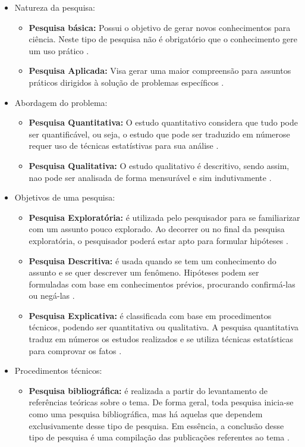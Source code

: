 \begin{itemize}
\item Natureza da pesquisa:
	\begin{itemize}
	\item \textbf{Pesquisa básica:} Possui o objetivo de gerar novos conhecimentos para ciência. Neste tipo de pesquisa não é obrigatório que o conhecimento gere um uso prático \cite{Tafner:2007}.
	\item \textbf{Pesquisa Aplicada:} Visa gerar uma maior compreensão para assuntos práticos dirigidos à solução de problemas específicos \cite{Tafner:2007}.
	\end{itemize}
\item Abordagem do problema:
	\begin{itemize}
	\item \textbf{Pesquisa Quantitativa:} O estudo quantitativo considera que tudo pode ser quantificável, ou seja, o estudo que pode ser traduzido em númerose requer uso de técnicas estatístivas para sua análise \cite{Travassos:2002}.
	\item \textbf{Pesquisa Qualitativa:} O estudo qualitativo é descritivo, sendo assim, nao pode ser analisada de forma mensurável e sim indutivamente \cite{Travassos:2002}.
	\end{itemize}
\item Objetivos de uma pesquisa:
	\begin{itemize}
	\item \textbf{Pesquisa Exploratória:} é utilizada pelo pesquisador para se familiarizar com um assunto pouco explorado. Ao decorrer ou no final da pesquisa exploratória, o pesquisador poderá estar apto para formular hipóteses \cite{Gil:2008}.
	\item \textbf{Pesquisa Descritiva:} é usada quando se tem um conhecimento do assunto e se quer descrever um fenômeno. Hipóteses podem ser formuladas com base em conhecimentos prévios, procurando confirmá-las ou negá-las \cite{Gil:2008}.
	\item \textbf{Pesquisa Explicativa:} é classificada com base em procedimentos técnicos, podendo ser quantitativa ou qualitativa. A pesquisa quantitativa traduz em números os estudos realizados e se utiliza técnicas estatísticas para comprovar os fatos \cite{Gil:2008}.
	\end{itemize}
\item Procedimentos técnicos:
	\begin{itemize}
	\item \textbf{Pesquisa bibliográfica:} é realizada a partir do levantamento de referências teóricas sobre o tema. De forma geral, toda pesquisa inicia-se como uma pesquisa bibliográfica, mas há aquelas que dependem exclusivamente desse tipo de pesquisa. Em essência, a conclusão desse tipo de pesquisa é uma compilação das publicações referentes ao tema \cite{Tafner:2007}.

\end{itemize}
\end{itemize}

